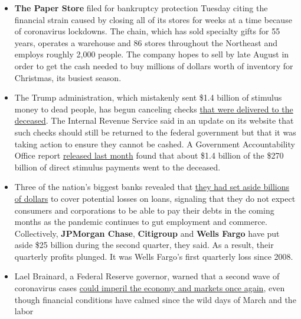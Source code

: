 \begin{itemize}
\item
  \textbf{The Paper Store} filed for bankruptcy protection Tuesday
  citing the financial strain caused by closing all of its stores for
  weeks at a time because of coronavirus lockdowns. The chain, which has
  sold specialty gifts for 55 years, operates a warehouse and 86 stores
  throughout the Northeast and employs roughly 2,000 people. The company
  hopes to sell by late August in order to get the cash needed to buy
  millions of dollars worth of inventory for Christmas, its busiest
  season.
\item
  The Trump administration, which mistakenly sent \$1.4 billion of
  stimulus money to dead people, has begun canceling checks
  \href{https://www.nytimes.com/live/2020/07/14/business/stock-market-updates-coronavirus\#the-irs-wants-the-stimulus-money-it-sent-to-dead-people-back}{that
  were delivered to the deceased}. The Internal Revenue Service said in
  an update on its website that such checks should still be returned to
  the federal government but that it was taking action to ensure they
  cannot be cashed. A Government Accountability Office report
  \href{https://www.nytimes.com/2020/06/25/us/politics/coronavirus-stimulus-dead-people.html}{released
  last month} found that about \$1.4 billion of the \$270 billion of
  direct stimulus payments went to the deceased.
\item
  Three of the nation's biggest banks revealed that
  \href{https://www.nytimes.com/live/2020/07/14/business/stock-market-updates-coronavirus\#banks-stockpile-billions-as-they-prepare-for-things-to-get-worse}{they
  had set aside billions of dollars} to cover potential losses on loans,
  signaling that they do not expect consumers and corporations to be
  able to pay their debts in the coming months as the pandemic continues
  to gut employment and commerce. Collectively, \textbf{JPMorgan Chase},
  \textbf{Citigroup} and \textbf{Wells Fargo} have put aside \$25
  billion during the second quarter, they said. As a result, their
  quarterly profits plunged. It was Wells Fargo's first quarterly loss
  since 2008.
\item
  Lael Brainard, a Federal Reserve governor, warned that a second wave
  of coronavirus cases
  \href{https://www.nytimes.com/live/2020/07/14/business/stock-market-updates-coronavirus\#a-fed-governor-warns-a-second-virus-wave-could-reignite-market-turmoil}{could
  imperil the economy and markets once again}, even though financial
  conditions have calmed since the wild days of March and the labor

\end{itemize}
